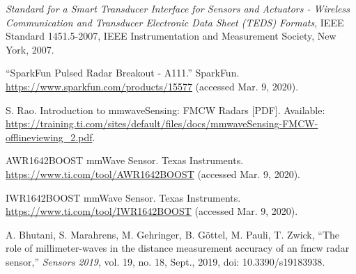 \documentclass[11pt]{IEEEtran}
\begin{document}
\begin{thebibliography}{00}
		 \textit{Standard for a Smart Transducer Interface for Sensors and Actuators - Wireless Communication and Transducer Electronic Data Sheet (TEDS) Formats}, IEEE Standard 1451.5-2007, IEEE Instrumentation and Measurement Society, New York, 2007. 


		 ``SparkFun Pulsed Radar Breakout - A111.'' SparkFun. \url{https://www.sparkfun.com/products/15577} (accessed Mar. 9, 2020).

		
		 S. Rao. Introduction to mmwaveSensing: FMCW Radars [PDF]. Available: \url{https://training.ti.com/sites/default/files/docs/mmwaveSensing-FMCW-offlineviewing_2.pdf}.


		 AWR1642BOOST mmWave Sensor. Texas Instruments. \url{https://www.ti.com/tool/AWR1642BOOST} (accessed Mar. 9, 2020).

		 IWR1642BOOST mmWave Sensor. Texas Instruments. \url{https://www.ti.com/tool/IWR1642BOOST} (accessed Mar. 9, 2020).
		
		 A. Bhutani, S. Marahrens, M. Gehringer, B. G{\"o}ttel, M. Pauli, T. Zwick, ``The role of millimeter-waves in the distance measurement accuracy of an fmcw radar sensor,'' \textit{Sensors 2019}, vol. 19, no. 18, Sept., 2019, doi: 10.3390/s19183938.
	\end{thebibliography}
\end{document}
